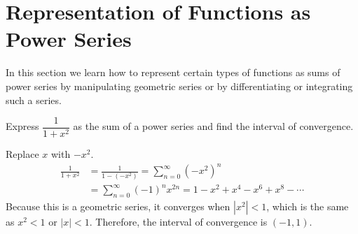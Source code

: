 \section{Representation of Functions as Power Series}
  In this section we learn how to represent certain types of functions as sums of power series by manipulating geometric series or by differentiating or integrating such a series.
  \begin{example}
    Express $\dfrac{1}{1+x^2}$ as the sum of a power series and find the interval of convergence.
  \end{example}
  \begin{solution}
    Replace $x$ with $-x^2$.
    \begin{align*}
      \frac{1}{1+x^2} &= \frac{1}{1-(-x^2)} = \sum_{n=0}^{\infty} (-x^2)^n \\
      &= \sum_{n=0}^{\infty} (-1)^n x^{2n} = 1-x^2 + x^4 - x^6 + x^8 - \cdots
    \end{align*}
    Because this is a geometric series, it converges when $|x^2|<1$, which is the same as $x^2<1$ or $|x|<1$. Therefore, the interval of convergence is $(-1,1)$.
  \end{solution}
